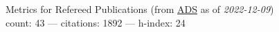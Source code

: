 Metrics for Refereed Publications (from \href{\adsurl}{ADS} as of \textit{2022-12-09}) \\count: 43 --- citations: 1892 --- h-index: 24